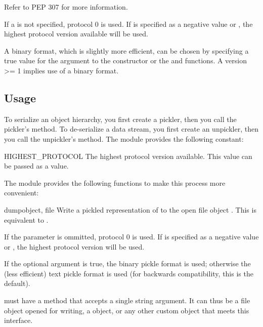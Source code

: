 Refer to PEP 307 for more information.

If a  is not specified, protocol 0 is used.
If  is specified as a negative value
or ,
the highest protocol version available will be used.


A binary format, which is slightly more efficient, can be chosen by
specifying a true value for the  argument to the
 constructor or the  and 
functions.  A  version >= 1 implies use of a binary format.

\subsection{Usage}

To serialize an object hierarchy, you first create a pickler, then you
call the pickler's  method.  To de-serialize a data
stream, you first create an unpickler, then you call the unpickler's
 method.  The  module provides the
following constant:

\begin{datadesc}{HIGHEST_PROTOCOL}
The highest protocol version available.  This value can be passed
as a  value.
\end{datadesc}

The  module provides the
following functions to make this process more convenient:

\begin{funcdesc}{dump}{object, file}
Write a pickled representation of  to the open file object
.  This is equivalent to
.

If the  parameter is ommitted, protocol 0 is used.
If  is specified as a negative value
or ,
the highest protocol version will be used.


If the optional  argument is true, the binary pickle format
is used; otherwise the (less efficient) text pickle format is used
(for backwards compatibility, this is the default).

 must have a  method that accepts a single
string argument.  It can thus be a file object opened for writing, a
 object, or any other custom
object that meets this interface.
\end{funcdesc}

